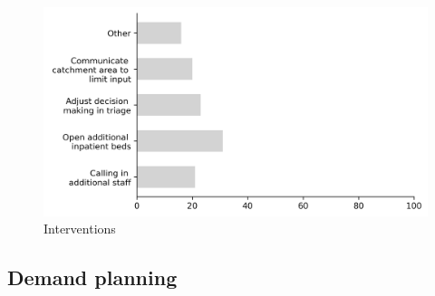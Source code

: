\documentclass{article}
\begin{document}
\begin{figure}[H]
    \centering
        \includegraphics[width=1.0\textwidth]{../output/plots/interventions}
        \caption{Interventions}
        \label{fig:interventions}
\end{figure}

\subsection{Demand planning}
\lipsum[4-6]
\end{document}
